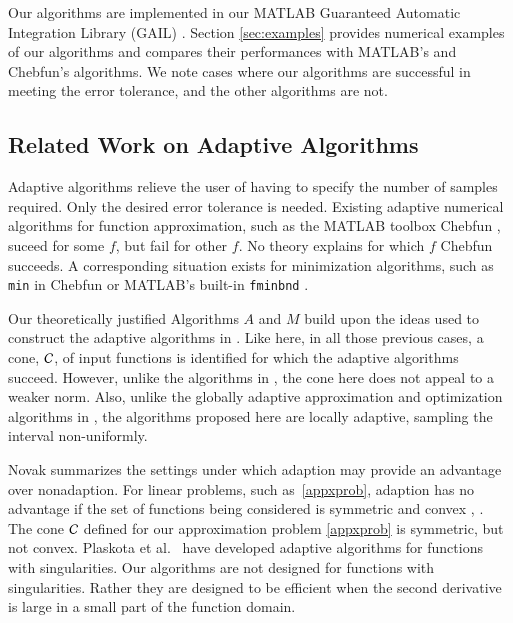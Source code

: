 \documentclass[review]{elsarticle}
\theoremstyle{definition}
\begin{document}
Our algorithms are implemented in our MATLAB Guaranteed Automatic
Integration Library (GAIL) \cite{ChoEtal15a}. Section \ref{sec:examples}
provides numerical examples of our algorithms and compares their
performances with MATLAB's and Chebfun's algorithms. We note cases where our
algorithms are successful in meeting the error tolerance, and the other
algorithms are not.

\subsection{Related Work on Adaptive Algorithms}

Adaptive algorithms relieve the user of having to specify the number of samples
required. Only the desired error tolerance is needed. Existing adaptive
numerical algorithms for function approximation, such as the MATLAB toolbox
Chebfun \citep{TrefEtal16a}, suceed for some $f$, but fail for other $f$. No
theory explains for which $f$ Chebfun succeeds. A corresponding situation exists
for minimization algorithms, such as \texttt{min} in Chebfun or MATLAB's
built-in \texttt{fminbnd} \citep{MAT9.0}.

Our theoretically justified Algorithms $A$ and $M$ build upon the ideas used to
construct the adaptive algorithms in \cite{HicEtal14b, Din15a, HicEtal14a,
HicJim16a, Jia16a, JimHic16a,Ton14a}. Like here, in all those previous cases, a
cone, $\mathcal{C}$, of input functions is identified for which the adaptive algorithms
succeed. However, unlike the algorithms in \cite{HicEtal14b, Din15a,
HicEtal14a,Ton14a}, the cone here does not appeal to a weaker norm. Also, unlike
the globally adaptive approximation and optimization algorithms in
\cite{HicEtal14b,Ton14a}, the algorithms proposed here are locally adaptive,
sampling the interval non-uniformly.

Novak \cite{Nov96a} summarizes the settings under which adaption may provide an
advantage over nonadaption. For linear problems, such as~\eqref{appxprob},
adaption has no advantage if the set of functions being considered is symmetric
and convex \cite[Theorem 1]{Nov96a}, \cite[Chapter 4, Theorem
5.2.1]{TraWasWoz88}. The cone $\mathcal{C}$ defined for our approximation problem
\eqref{appxprob} is symmetric, but not convex. Plaskota et al.~\cite{PlaEtal08a}
have developed adaptive algorithms for functions with singularities. Our
algorithms are not designed for functions with singularities. Rather they are
designed to be efficient when the second derivative is large in a small part of
the function domain.
\end{document}
